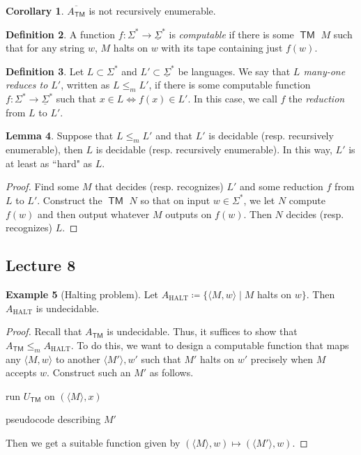 \documentclass[10pt,letterpaper,cm]{nupset}
\theoremstyle{definition}
\newtheorem{definition}{Definition}[subsection]
\newtheorem{exmp}[definition]{Example}
\theoremstyle{theorem}
\newtheorem{lemma}[definition]{Lemma}
\newtheorem{corollary}[definition]{Corollary}
\theoremstyle{remark}
\newcommand{\1}{\mathbf{1}}
\newcommand{\0}{\vec 0}
\DeclareMathOperator{\TM}{\mathsf{TM}}
\begin{document}
\begin{corollary}
$\overline{A_{\TM}}$ is not recursively enumerable. 
\end{corollary}

\begin{definition}
A function $f: \Sigma^{\ast} \to \underline{\Sigma}^{\ast}$ is \textit{computable} if there is some $\TM$ $M$ such that for any string $w$, $M$ halts on $w$ with its tape containing just $f(w)$. 
\end{definition}

\begin{definition}
Let $L\subset \Sigma^{\ast}$ and $L' \subset \underline{\Sigma}^{\ast}$ be languages. We say that \textit{$L$ many-one reduces to $L'$}, written as $L \leq_m L'$, if there is some computable function $f: \Sigma^{\ast} \to \underline{\Sigma}^{\ast}$ such that $x\in L \iff f(x) \in L'$. In this case, we call $f$ the \textit{reduction} from $L$ to $L'$.
\end{definition}

\begin{lemma}
Suppose that $L \leq_m L'$ and that $L'$ is decidable (resp. recursively enumerable), then $L$ is decidable (resp. recursively enumerable). In this way, $L'$ is at least as ``hard" as $L$.
\end{lemma}
\begin{proof}
Find some $M$ that decides (resp. recognizes) $L'$ and some reduction $f$ from $L$ to $L'$. Construct the $\TM$ $N$ so that on input $w\in \Sigma^{\ast}$, we let $N$ compute $f(w)$ and then output whatever $M$ outputs on $f(w)$. Then $N$ decides (resp. recognizes) $L$. 
\end{proof}

\subsection{Lecture 8}

\begin{exmp}[Halting problem]
Let $A_{\text{HALT}} \coloneqq \{\langle M, w \rangle \mid M$ halts on $w\}$. Then $A_{\text{HALT}}$ is undecidable.
\end{exmp}
\begin{proof}
Recall that $A_{\TM}$ is undecidable. Thus, it suffices to show that $A_{\TM} \leq_m A_{\text{HALT}}$. To do this, we want to design a computable function that maps any $\langle M, w \rangle$ to another $\langle M' \rangle, w'$ such that $M'$ halts on $w'$ precisely when $M$ accepts $w$. Construct such an $M'$ as follows.

\begin{algorithm}[H]
    {run $U_{\TM}$ on $(\langle M \rangle, x)$}\;
     \eIf{$U_{\TM}$ accepts}{accept}{
     \While{true}{pass}
     } 
      \caption{pseudocode describing $M'$}
\end{algorithm}

Then we get a suitable function given by $(\langle M \rangle , w) \mapsto (\langle M' \rangle, w)$.
\end{proof}
\end{document}
